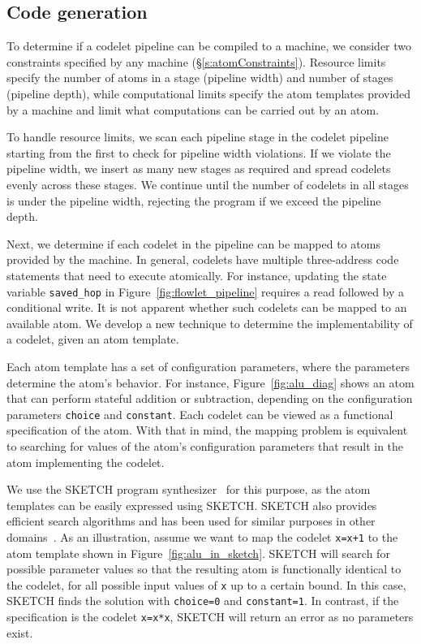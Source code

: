 \subsection{Code generation}
\label{ss:code_gen}

To determine if a codelet pipeline can be compiled to a \absmachine machine, we
consider two constraints specified by any \absmachine machine
(\S\ref{s:atomConstraints}).  Resource limits specify the number of atoms in a
stage (pipeline width) and number of stages (pipeline depth), while
computational limits specify the atom templates provided by a \absmachine
machine and limit what computations can be carried out by an atom.

 To handle resource limits, we scan each pipeline
stage in the codelet pipeline starting from the first to check for pipeline
width violations. If we violate the pipeline width, we insert as many new
stages as required and spread codelets evenly across these stages.  We continue
until the number of codelets in all stages is under the pipeline width,
rejecting the program if we exceed the pipeline depth.

 Next, we determine if each codelet in the pipeline
can be mapped to atoms provided by the \absmachine machine. In general,
codelets have multiple three-address code statements that need to execute
atomically. For instance, updating the state variable \texttt{saved\_hop} in
Figure~\ref{fig:flowlet_pipeline} requires a read followed by a conditional
write.  It is not apparent whether such codelets can be mapped to an available
atom. We develop a new technique to determine the implementability of a codelet,
given an atom template.

Each atom template has a set of configuration parameters, where the parameters
determine the atom's behavior.  For instance, Figure~\ref{fig:alu_diag} shows
an atom that can perform stateful addition or subtraction, depending on the
configuration parameters {\tt choice} and {\tt constant}.  Each codelet can be
viewed as a functional specification of the atom.  With that in mind, the
mapping problem is equivalent to searching for values of the atom's configuration
parameters that result in the atom implementing the codelet.

We use the SKETCH program synthesizer~\cite{sketch_asplos} for this purpose, as
the atom templates can be easily expressed using SKETCH. SKETCH also provides
efficient search algorithms and has been used for similar purposes in other
domains~\cite{lifejoin, qbs}. As an illustration, assume we want to map the
codelet {\tt x=x+1} to the atom template shown in
Figure~\ref{fig:alu_in_sketch}. SKETCH will search for possible parameter
values so that the resulting atom is functionally identical to the codelet, for
all possible input values of {\tt x} up to a certain bound.  In this case,
SKETCH finds the solution with {\tt choice=0} and {\tt constant=1}.  In
contrast, if the specification is the codelet {\tt x=x*x}, SKETCH will return
an error as no parameters exist.

